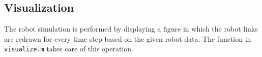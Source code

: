 

\subsection{Visualization}

The robot simulation is performed by displaying a figure in which the robot links are redrawn for every time step based on the given robot data. The function in \texttt{visualize.m} takes care of this operation.